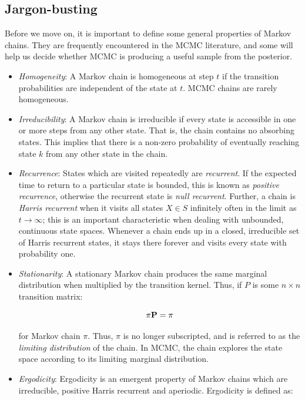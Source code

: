 \hypertarget{jargon-busting}{}
\subsection*{Jargon-busting}

Before we move on, it is important to define some general properties of Markov chains. They are frequently encountered in the MCMC literature, and some will help us decide whether MCMC is producing a useful sample from the posterior.

\begin{itemize}
\item \emph{Homogeneity}: A Markov chain is homogeneous at step $t$ if the transition probabilities are independent of the state at $t$. MCMC chains are rarely homogeneous.
\item \emph{Irreducibility}: A Markov chain is irreducible if every state is accessible in one or more steps from any other state. That is, the chain contains no absorbing states. This implies that there is a non-zero probability of eventually reaching state $k$ from any other state in the chain.
\item \emph{Recurrence}: States which are visited repeatedly are \emph{recurrent}. If the expected time to return to a particular state is bounded, this is known as \emph{positive recurrence}, otherwise the recurrent state is \emph{null recurrent}. Further, a chain is \emph{Harris recurrent} when it visits all states $X \in S$ infinitely often in the limit as $t \to \infty$; this is an important characteristic when dealing with unbounded, continuous state spaces. Whenever a chain ends up in a closed, irreducible set of Harris recurrent states, it stays there forever and visits every state with probability one.
\item \emph{Stationarity}: A stationary Markov chain produces the same marginal distribution when multiplied by the transition kernel.  Thus, if $P$ is some $n \times n$ transition matrix:

\[{\bf \pi P} = {\bf \pi}\]

\noindent for Markov chain $\pi$. Thus, $\pi$ is no longer subscripted, and is referred to as the \emph{limiting distribution} of the chain. In MCMC, the chain explores the state space according to its limiting marginal distribution.
\item \emph{Ergodicity}: Ergodicity is an emergent property of Markov chains which are irreducible, positive Harris recurrent and aperiodic. Ergodicity is defined as:


\end{itemize}
